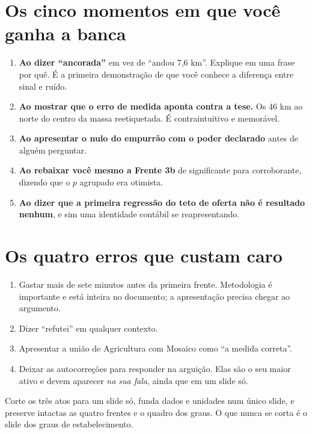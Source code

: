 \section{Os cinco momentos em que você ganha a banca}

\begin{enumerate}
\item \textbf{Ao dizer ``ancorada''} em vez de ``andou 7,6 km''. Explique em uma
frase por quê. É a primeira demonstração de que você conhece a diferença entre
sinal e ruído.
\item \textbf{Ao mostrar que o erro de medida aponta contra a tese.} Os 46 km ao
norte do centro da massa reetiquetada. É contraintuitivo e memorável.
\item \textbf{Ao apresentar o nulo do empurrão com o poder declarado} antes de
alguém perguntar.
\item \textbf{Ao rebaixar você mesmo a Frente 3b} de significante para
corroborante, dizendo que o $p$ agrupado era otimista.
\item \textbf{Ao dizer que a primeira regressão do teto de oferta não é
resultado nenhum}, e sim uma identidade contábil se reapresentando.
\end{enumerate}

\section{Os quatro erros que custam caro}

\begin{enumerate}
\item Gastar mais de sete minutos antes da primeira frente. Metodologia é
importante e está inteira no documento; a apresentação precisa chegar ao
argumento.
\item Dizer ``refutei'' em qualquer contexto.
\item Apresentar a união de Agricultura com Mosaico como ``a medida correta''.
\item Deixar as autocorreções para responder na arguição. Elas são o seu maior
ativo e devem aparecer \emph{na sua fala}, ainda que em um slide só.
\end{enumerate}

\begin{nabanca}
Corte os três atos para um slide só, funda dados e unidades num único slide, e
preserve intactas as quatro frentes e o quadro dos graus. O que nunca se corta é
o slide dos graus de estabelecimento.
\end{nabanca}

